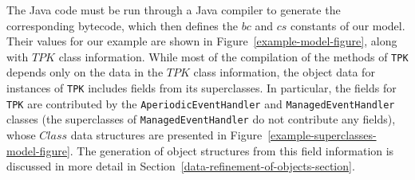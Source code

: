 The Java code must be run through a Java compiler to generate the
corresponding bytecode, which then defines the $bc$ and $cs$ constants
of our model.
Their values for our example are shown in
Figure~\ref{example-model-figure}, along with $TPK$ class information.
While most of the compilation of the methods of \texttt{TPK} depends
only on the data in the $TPK$ class information, the object data for
instances of \texttt{TPK} includes fields from its superclasses.
In particular, the fields for \texttt{TPK} are contributed by the
\texttt{AperiodicEventHandler} and \texttt{ManagedEventHandler}
classes (the superclasses of \texttt{ManagedEventHandler} do not
contribute any fields), whose $Class$ data structures are presented in
Figure~\ref{example-superclasses-model-figure}.
The generation of object structures from this field information is
discussed in more detail in
Section~\ref{data-refinement-of-objects-section}.

